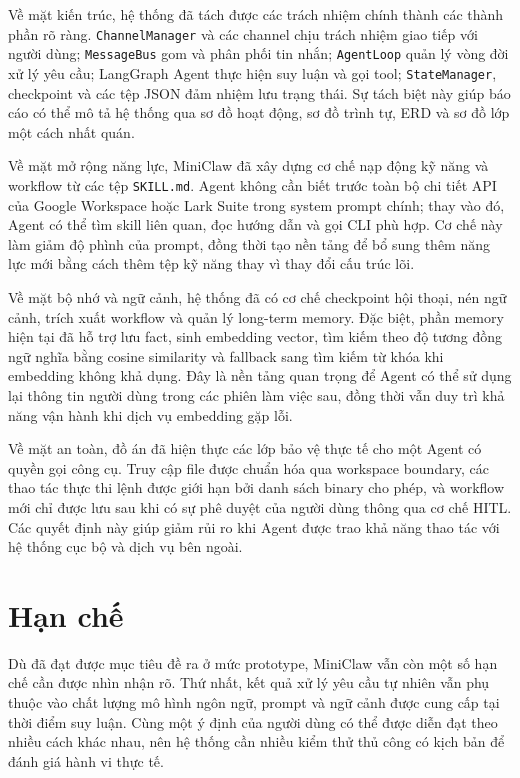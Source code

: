 Về mặt kiến trúc, hệ thống đã tách được các trách nhiệm chính thành các thành phần rõ ràng. \texttt{ChannelManager} và các channel chịu trách nhiệm giao tiếp với người dùng; \texttt{MessageBus} gom và phân phối tin nhắn; \texttt{AgentLoop} quản lý vòng đời xử lý yêu cầu; LangGraph Agent thực hiện suy luận và gọi tool; \texttt{StateManager}, checkpoint và các tệp JSON đảm nhiệm lưu trạng thái. Sự tách biệt này giúp báo cáo có thể mô tả hệ thống qua sơ đồ hoạt động, sơ đồ trình tự, ERD và sơ đồ lớp một cách nhất quán.

Về mặt mở rộng năng lực, MiniClaw đã xây dựng cơ chế nạp động kỹ năng và workflow từ các tệp \texttt{SKILL.md}. Agent không cần biết trước toàn bộ chi tiết API của Google Workspace hoặc Lark Suite trong system prompt chính; thay vào đó, Agent có thể tìm skill liên quan, đọc hướng dẫn và gọi CLI phù hợp. Cơ chế này làm giảm độ phình của prompt, đồng thời tạo nền tảng để bổ sung thêm năng lực mới bằng cách thêm tệp kỹ năng thay vì thay đổi cấu trúc lõi.

Về mặt bộ nhớ và ngữ cảnh, hệ thống đã có cơ chế checkpoint hội thoại, nén ngữ cảnh, trích xuất workflow và quản lý long-term memory. Đặc biệt, phần memory hiện tại đã hỗ trợ lưu fact, sinh embedding vector, tìm kiếm theo độ tương đồng ngữ nghĩa bằng cosine similarity và fallback sang tìm kiếm từ khóa khi embedding không khả dụng. Đây là nền tảng quan trọng để Agent có thể sử dụng lại thông tin người dùng trong các phiên làm việc sau, đồng thời vẫn duy trì khả năng vận hành khi dịch vụ embedding gặp lỗi.

Về mặt an toàn, đồ án đã hiện thực các lớp bảo vệ thực tế cho một Agent có quyền gọi công cụ. Truy cập file được chuẩn hóa qua workspace boundary, các thao tác thực thi lệnh được giới hạn bởi danh sách binary cho phép, và workflow mới chỉ được lưu sau khi có sự phê duyệt của người dùng thông qua cơ chế HITL. Các quyết định này giúp giảm rủi ro khi Agent được trao khả năng thao tác với hệ thống cục bộ và dịch vụ bên ngoài.

\section{Hạn chế}
Dù đã đạt được mục tiêu đề ra ở mức prototype, MiniClaw vẫn còn một số hạn chế cần được nhìn nhận rõ. Thứ nhất, kết quả xử lý yêu cầu tự nhiên vẫn phụ thuộc vào chất lượng mô hình ngôn ngữ, prompt và ngữ cảnh được cung cấp tại thời điểm suy luận. Cùng một ý định của người dùng có thể được diễn đạt theo nhiều cách khác nhau, nên hệ thống cần nhiều kiểm thử thủ công có kịch bản để đánh giá hành vi thực tế.

